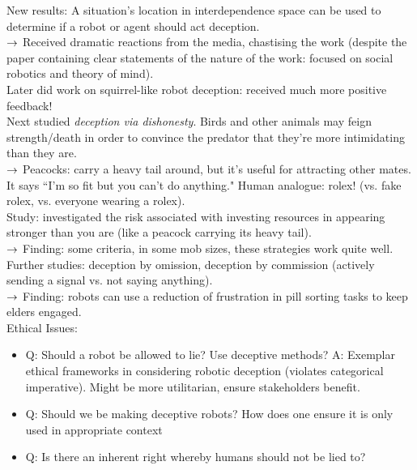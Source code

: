 New results: A situation's location in interdependence space can be used to determine if a robot or agent should act deception. \\

$\rightarrow$ Received dramatic reactions from the media, chastising the work (despite the paper containing clear statements of the nature of the work: focused on social robotics and theory of mind). \\

Later did work on squirrel-like robot deception: received much more positive feedback! \\

Next studied {\it deception via dishonesty}. Birds and other animals may feign strength/death in order to convince the predator that they're more intimidating than they are. \\

$\rightarrow$ Peacocks: carry a heavy tail around, but it's useful for attracting other mates. It says ``I'm so fit but you can't do anything." Human analogue: rolex! (vs. fake rolex, vs. everyone wearing a rolex). \\

Study: investigated the risk associated with investing resources in appearing stronger than you are (like a peacock carrying its heavy tail). \\

$\rightarrow$ Finding: some criteria, in some mob sizes, these strategies work quite well.\\

Further studies: deception by omission, deception by commission (actively sending a signal vs. not saying anything). \\

$\rightarrow$ Finding: robots can use a reduction of frustration in pill sorting tasks to keep elders engaged. \\

Ethical Issues:
\begin{itemize}
\item Q: Should a robot be allowed to lie? Use deceptive methods?
A: Exemplar ethical frameworks in considering robotic deception (violates categorical imperative). Might be more utilitarian, ensure stakeholders benefit.

\item Q: Should we be making deceptive robots? How does one ensure it is only used in appropriate context
\item Q: Is there an inherent right whereby humans should not be lied to?
\end{itemize}

